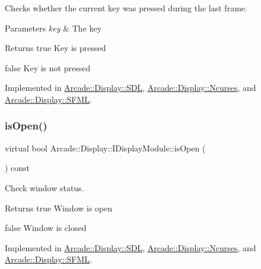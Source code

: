 Checks whether the current key was pressed during the last frame. 


\begin{DoxyParams}{Parameters}
{\em key} & The key \\
\hline
\end{DoxyParams}
\begin{DoxyReturn}{Returns}
true Key is pressed 

false Key is not pressed 
\end{DoxyReturn}


Implemented in \mbox{\hyperlink{classArcade_1_1Display_1_1SDL_a14dd612e3902b1daa1d31cca71efcf00}{Arcade\+::\+Display\+::\+S\+DL}}, \mbox{\hyperlink{classArcade_1_1Display_1_1Ncurses_ae32ffc3c3923c09809c6d13822606af1}{Arcade\+::\+Display\+::\+Ncurses}}, and \mbox{\hyperlink{classArcade_1_1Display_1_1SFML_a5695d2a080b43f958adf3a63acf5cf78}{Arcade\+::\+Display\+::\+S\+F\+ML}}.

\mbox{\label{classArcade_1_1Display_1_1IDisplayModule_a34c86dd2e7aa60a70c0cc06ccbd34e47}} 
\subsubsection{\texorpdfstring{isOpen()}{isOpen()}}
{\footnotesize\ttfamily virtual bool Arcade\+::\+Display\+::\+I\+Display\+Module\+::is\+Open (\begin{DoxyParamCaption}{ }\end{DoxyParamCaption}) const\hspace{0.3cm}{\ttfamily [pure virtual]}}



Check window status. 

\begin{DoxyReturn}{Returns}
true Window is open 

false Window is closed 
\end{DoxyReturn}


Implemented in \mbox{\hyperlink{classArcade_1_1Display_1_1SDL_a7d86c934d5dde9283e9c70816cf9c8a5}{Arcade\+::\+Display\+::\+S\+DL}}, \mbox{\hyperlink{classArcade_1_1Display_1_1Ncurses_a57f8a7c485cba89aa6862c2b84e442c0}{Arcade\+::\+Display\+::\+Ncurses}}, and \mbox{\hyperlink{classArcade_1_1Display_1_1SFML_a77be7097a8ed969dcf1fca6f960d0c4c}{Arcade\+::\+Display\+::\+S\+F\+ML}}.

